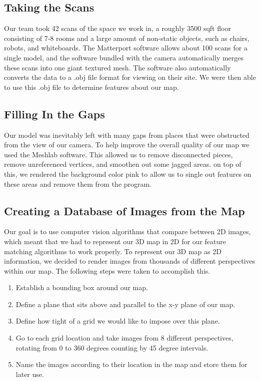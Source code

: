 \documentclass[a4paper,11pt]{article}
\begin{document}
  \subsection{Taking the Scans}
 Our team took 42 scans of the space we work in, a roughly 3500 sqft floor consisting of 7-8 rooms and a large amount of non-static objects, such as chairs, robots, and whiteboards. The Matterport software allows about 100 scans for a single model, and the software bundled with the camera automatically merges these scans into one giant textured mesh. The software also automatically converts the data to a .obj file format for viewing on their site. We were then able to use this .obj file to determine features about our map.


  \subsection{Filling In the Gaps}
  Our model was inevitably left with many gaps from places that were obstructed from the view of our camera. To help improve the overall quality of our map we used the Meshlab software. This allowed us to remove disconnected pieces, remove unreferenced vertices, and smoothen out some jagged areas. on top of this, we rendered the background color pink to allow us to single out features on these areas and remove them from the program.
  
  \subsection{Creating a Database of Images from the Map}
  Our goal is to use computer vision algorithms that compare between 2D images, which meant that we had to represent our 3D map in 2D for our feature matching algorithms to work properly. To represent our 3D map as 2D information, we decided to render images from thousands of different perspectives within our map. The following steps were taken to accomplish this.
  \begin{enumerate}
  \item Establish a bounding box around our map.
  \item Define a plane that sits above and parallel to the x-y plane of our map.
  \item Define how tight of a grid we would like to impose over this plane.
  \item Go to each grid location and take images from 8 different perspectives, rotating from 0 to 360 degrees counting by 45 degree intervals.
  \item Name the images according to their location in the map and store them for later use.
  \end{enumerate}
\end{document}
